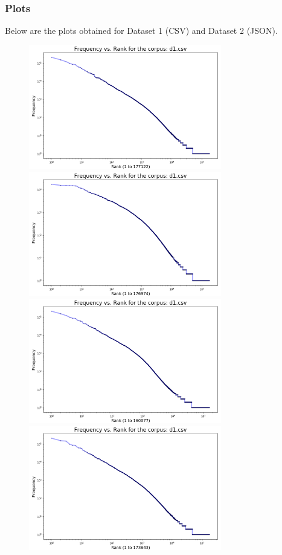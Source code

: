 \documentclass{article}
\begin{document}
\subsubsection{Plots}
\begin{flushleft}
Below are the plots obtained for Dataset 1 (CSV) and Dataset 2 (JSON).
\begin{figure}[H]
\begin{minipage}{0.45\linewidth}
\centering
\includegraphics[width=0.75\textwidth]{./images/dataset-1-t1-0.png}
\includegraphics[width=0.75\textwidth]{./images/dataset-1-t1-1.png}
\includegraphics[width=0.75\textwidth]{./images/dataset-1-t1-2.png}
\includegraphics[width=0.75\textwidth]{./images/dataset-1-t1-3.png}

\end{minipage}
\end{figure}
\end{flushleft}
\end{document}

